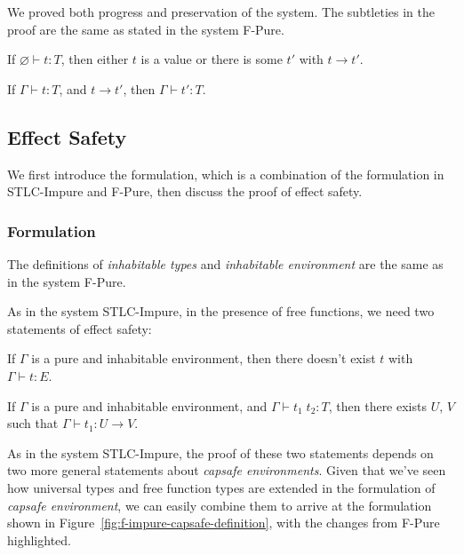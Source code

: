 We proved both progress and preservation of the system. The subtleties
in the proof are the same as stated in the system F-Pure.

\begin{theorem}[Progress]
If $\varnothing \vdash t : T$, then either $t$ is a value or there is some
$t'$ with $t \longrightarrow t'$.
\end{theorem}

\begin{theorem}[Preservation]
If $\Gamma \vdash t : T$, and $t \longrightarrow t'$, then $\Gamma
\vdash t' : T$.
\end{theorem}

\subsection{Effect Safety}

We first introduce the formulation, which is a combination of the
formulation in STLC-Impure and F-Pure, then discuss the proof of
effect safety.

\subsubsection{Formulation}

The definitions of \emph{inhabitable types} and \emph{inhabitable
  environment} are the same as in the system F-Pure.

As in the system STLC-Impure, in the presence of free functions, we
need two statements of effect safety:

\begin{definition}
  If $\Gamma$ is a pure and inhabitable environment, then there
  doesn't exist $t$ with $\Gamma \vdash t : E$.
\end{definition}

\begin{definition}
  If $\Gamma$ is a pure and inhabitable environment, and
  $\Gamma \vdash t_1 \; t_2 : T$, then there exists $U$, $V$ such that
  $\Gamma \vdash t_1 : U \to V$.
\end{definition}

As in the system STLC-Impure, the proof of these two statements
depends on two more general statements about \emph{capsafe
  environments}. Given that we've seen how universal types and free
function types are extended in the formulation of \emph{capsafe
  environment}, we can easily combine them to arrive at the
formulation shown in Figure~\ref{fig:f-impure-capsafe-definition},
with the changes from F-Pure highlighted.

